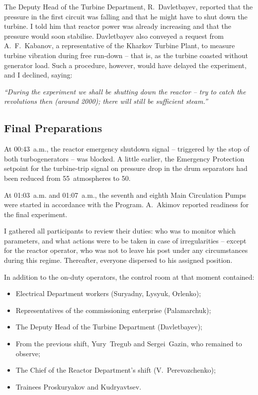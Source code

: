 \documentclass[openright]{bookest}
\begin{document}
The Deputy Head of the Turbine Department, R.~Davletbayev, reported that the pressure in the first circuit was falling and that he might have to shut down the turbine. I told him that reactor power was already increasing and that the pressure would soon stabilise. Davletbayev also conveyed a request from A.~F.~Kabanov, a representative of the Kharkov Turbine Plant, to measure turbine vibration during free run-down -- that is, as the turbine coasted without generator load. Such a procedure, however, would have delayed the experiment, and I declined, saying:

\begin{personal}
\par \textit{``During the experiment we shall be shutting down the reactor -- try to catch the revolutions then (around \qty{2000}{\rpm}); there will still be sufficient steam.''}
\end{personal}

\subsection{Final Preparations}

At 00:43~a.m., the reactor emergency shutdown signal -- triggered by the stop of both turbogenerators -- was blocked. A little earlier, the Emergency Protection setpoint for the turbine-trip signal on pressure drop in the drum separators had been reduced from \num{55}~atmospheres to \num{50}.

At 01:03~a.m. and 01:07~a.m., the seventh and eighth Main Circulation Pumps were started in accordance with the Program. A.~Akimov reported readiness for the final experiment.

I gathered all participants to review their duties: who was to monitor which parameters, and what actions were to be taken in case of irregularities -- except for the reactor operator, who was not to leave his post under any circumstances during this regime. Thereafter, everyone dispersed to his assigned position.

In addition to the on-duty operators, the control room at that moment contained:

\begin{itemize}
\item Electrical Department workers (Suryadny, Lysyuk, Orlenko);
\item Representatives of the commissioning enterprise (Palamarchuk);
\item The Deputy Head of the Turbine Department (Davletbayev);
\item From the previous shift, Yury~Tregub and Sergei~Gazin, who remained to observe;
\item The Chief of the Reactor Department's shift (V.~Perevozchenko);
\item Trainees Proskuryakov and Kudryavtsev.
\end{itemize}
\end{document}
